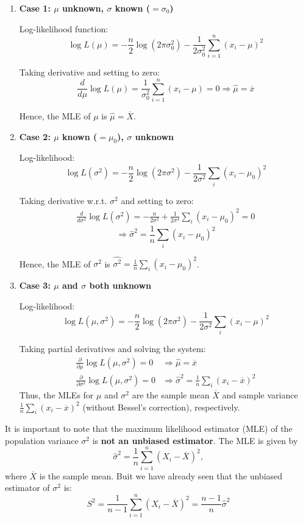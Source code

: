 \documentclass[twoside]{book}
\begin{document}
\begin{enumerate}[label=(\roman*)]
\item \textbf{Case 1: \( \mu \) unknown, \( \sigma \) known ($=\sigma_0$)}

Log-likelihood function:
\[
\log L(\mu) = -\frac{n}{2} \log(2\pi\sigma_0^2) - \frac{1}{2\sigma_0^2} \sum_{i=1}^n (x_i - \mu)^2
\]

Taking derivative and setting to zero:
\[
\frac{d}{d\mu}\log L(\mu) = \frac{1}{\sigma_0^2} \sum_{i=1}^n (x_i - \mu) = 0 \Rightarrow \hat{\mu} = \overline{x}
\]

Hence, the MLE of $\mu$ is $\hat{\mu} = \overline{X}$.

\item \textbf{Case 2: \( \mu \) known ($=\mu_0$), \( \sigma \) unknown}

Log-likelihood:
\[
\log L(\sigma^2) = -\frac{n}{2} \log(2\pi\sigma^2) - \frac{1}{2\sigma^2} \sum_i (x_i - \mu_0)^2
\]

Taking derivative w.r.t. \( \sigma^2 \) and setting to zero:
\begin{align*}
\frac{d}{d\sigma^2}\log L(\sigma^2) = -\frac{n}{2\sigma^2}+\frac{1}{2\sigma^4}\sum_i (x_i - \mu_0)^2= 0
\end{align*}
\[
\Rightarrow \hat{\sigma}^2 = \frac{1}{n} \sum_i (x_i - \mu_0)^2
\]

Hence, the MLE of $\sigma^2$ is $\hat{\sigma^2} = \frac{1}{n} \sum_i (x_i - \mu_0)^2$.

\item \textbf{Case 3: \( \mu \) and \( \sigma \) both unknown}

Log-likelihood:
\[
\log L(\mu,\sigma^2) = -\frac{n}{2} \log(2\pi\sigma^2) - \frac{1}{2\sigma^2} \sum_i (x_i - \mu)^2
\]

Taking partial derivatives and solving the system:
\begin{align*}
\frac{\partial}{\partial \mu} \log L(\mu,\sigma^2) = 0 &\Rightarrow \hat{\mu} = \overline{x} \\
\frac{\partial}{\partial \sigma^2} \log L(\mu,\sigma^2) = 0 &\Rightarrow \hat{\sigma}^2 = \frac{1}{n} \sum_i (x_i - \overline{x})^2
\end{align*}
Thus, the MLEs for \( \mu \) and \( \sigma^2 \) are the sample mean $\overline{X}$ and sample variance $\frac{1}{n} \sum_i (x_i - \overline{x})^2$ (without Bessel's correction), respectively.

\end{enumerate}

It is important to note that the maximum likelihood estimator (MLE) of the population variance \( \sigma^2 \) is \textbf{not an unbiased estimator}. The MLE is given by
\[
\hat{\sigma}^2 = \frac{1}{n} \sum_{i=1}^n (X_i - \overline{X})^2,
\]
where \( \overline{X} \) is the sample mean. Buit we have already seen that the unbiased estimator of $\sigma^2$ is:
\[
S^2 = \frac{1}{n-1} \sum_{i=1}^n (X_i - \overline{X})^2 = \frac{n-1}{n}\hat{\sigma}^2
\]
\end{document}
